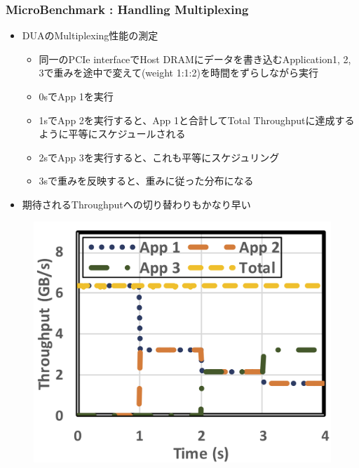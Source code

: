 \documentclass[dvipdfmx,9pt,notheorems]{beamer}
\theoremstyle{definition}
\begin{document}
\begin{frame}\frametitle{MicroBenchmark : Handling Multiplexing}
	\begin{itemize}
			\item DUAのMultiplexing性能の測定
				\begin{itemize}
					\item 同一のPCIe interfaceでHost DRAMにデータを書き込むApplication1, 2, 3で重みを途中で変えて(weight 1:1:2)を時間をずらしながら実行
					\item 0sでApp 1を実行
					\item 1sでApp 2を実行すると、App 1と合計してTotal Throughputに達成するように平等にスケジュールされる
					\item 2sでApp 3を実行すると、これも平等にスケジュリング
					\item 3sで重みを反映すると、重みに従った分布になる
				\end{itemize}
			\item 期待されるThroughputへの切り替わりもかなり早い
	\end{itemize}
  \begin{figure}[htb]
		\includegraphics[scale=1.0]{fig/figure11b.png}
  \end{figure}
\pnote{
}
\end{frame}
\end{document}
